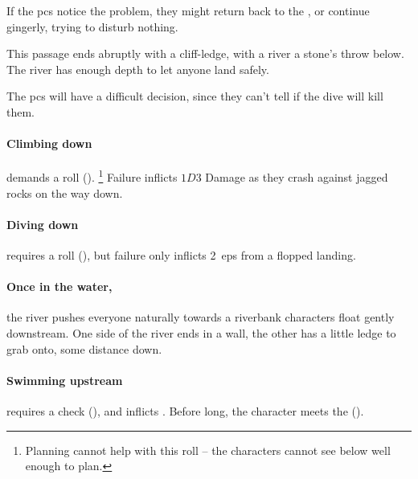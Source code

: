 \begin{multicols}{2}
If the \glspl{pc} notice the problem, they might return back to the , or continue gingerly, trying to disturb nothing.



This passage ends abruptly with a cliff-ledge, with a river a stone's throw below.
The river has enough depth to let anyone land safely.

The \glspl{pc} will have a difficult decision, since they can't tell if the dive will kill them.

\paragraph{Climbing down}
demands a  roll (\tn[9]).%
\footnote{Planning cannot help with this roll -- the characters cannot see below well enough to plan.}
Failure inflicts $1D3$ Damage as they crash against jagged rocks on the way down.

\paragraph{Diving down}
requires a  roll (\tn[10]), but failure only inflicts 2~\glspl{ep} from a flopped landing.

\paragraph{Once in the water,}
the river pushes everyone naturally towards a riverbank
characters float gently downstream.
One side of the river ends in a wall, the other has a little ledge to grab onto, some distance down.

\paragraph{Swimming upstream}
requires a  check (\tn[14]), and inflicts .
Before long, the character meets the  ().




\end{multicols}
